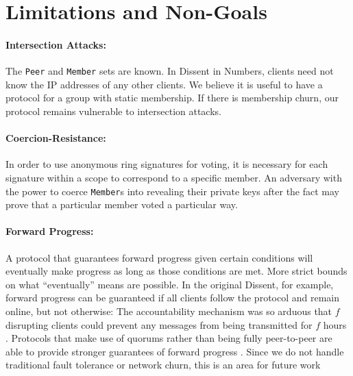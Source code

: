 \section{Limitations and Non-Goals}
  \paragraph{Intersection Attacks:} The \texttt{Peer} and \texttt{Member} sets
  are known. In Dissent in Numbers, clients need not know the IP addresses of
  any other clients. We believe it is useful to have a protocol for a group with
  static membership.  If there is membership churn, our protocol remains
  vulnerable to intersection attacks.
  \paragraph{Coercion-Resistance:} In order to use anonymous ring signatures for
  voting, it is necessary for each signature within a scope to correspond to a
  specific member. An adversary with the power to coerce \texttt{Member}s into
  revealing their private keys after the fact may prove that a particular member
  voted a particular way\cite{lrs}.
  \paragraph{Forward Progress:} A protocol that guarantees forward progress
  given certain conditions will eventually make progress as long as those
  conditions are met. More strict bounds on what ``eventually'' means are
  possible. In the original Dissent, for example, forward progress can be
  guaranteed if all clients follow the protocol and remain online, but not
  otherwise: The accountability mechanism was so arduous that $f$ disrupting
  clients could prevent any messages from being transmitted for $f$ hours
  \cite{verdict}. Protocols that make use of quorums
  rather than being fully peer-to-peer are able to provide stronger guarantees
  of forward progress \cite{paxos}. Since we do not handle traditional fault
  tolerance or network churn,  this is an area
  for future work 
